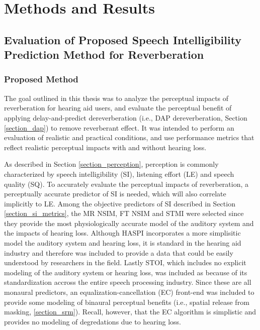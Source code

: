 \chapter{Methods and Results}

\section{Evaluation of Proposed Speech Intelligibility Prediction Method for Reverberation}

\subsection{Proposed Method}

The goal outlined in this thesis was to analyze the perceptual impacts of reverberation for hearing aid users, and evaluate the perceptual benefit of applying delay-and-predict dereverberation (i.e., DAP dereverberation, Section \ref{section_dap}) to remove reverberant effect. It was intended to perform an evaluation of realistic and practical conditions, and use performance metrics that reflect realistic perceptual impacts with and without hearing loss. 

As described in Section \ref{section_perception}, perception is commonly characterized by speech intelligibility (SI), listening effort (LE) and speech quality (SQ). To accurately evaluate the perceptual impacts of reverberation, a perceptually accurate predictor of SI is needed, which will also correlate implicitly to LE. Among the objective predictors of SI described in Section \ref{section_si_metrics}, the MR NSIM, FT NSIM and STMI were selected since they provide the most physiologically accurate model of the auditory system and the impacts of hearing loss. Although HASPI incorporates a more simplisitic model the auditory system and hearing loss, it is standard in the hearing aid industry and therefore was included to provide a data that could be easily understood by researchers in the field. Lastly STOI, which includes no explicit modeling of the auditory system or hearing loss, was included as because of its standardization accross the entire speech processing industry. Since these are all monaural predictors, an equalization-cancellation (EC) front-end was included to provide some modeling of binaural perceptual benefits (i.e., spatial release from masking, \ref{section_srm}). Recall, however, that the EC algorithm is simplistic and provides no modeling of degredations due to hearing loss.

